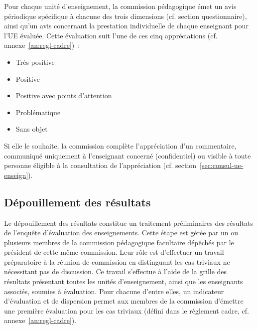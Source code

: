 \documentclass[a4paper,11pt]{report}
\begin{document}
Pour chaque unité d'enseignement, la commission pédagogique émet un avis périodique spécifique à chacune des trois dimensions (cf. section questionnaire), ainsi qu'un avis concernant la prestation individuelle de chaque enseignant pour l'UE évaluée.
Cette évaluation suit l'une de ces cinq appréciations (cf. annexe~\ref{an:regl-cadre})~:
\begin{itemize}
	\item Très positive
	\item Positive
	\item Positive avec points d'attention
	\item Problématique
	\item Sans objet
\end{itemize}
Si elle le souhaite, la commission complète l'appréciation d'un commentaire, communiqué uniquement à l'enseignant concerné (confidentiel) ou visible à toute personne éligible à la consultation de l'appréciation (cf. section~\ref{sec:consul-ue-enseign}).








\subsection{Dépouillement des résultats}
Le dépouillement des résultats constitue un traitement préliminaires des résultats de l'enquête d'évaluation des enseignements.
Cette étape est gérée par un ou plusieurs membres de la commission pédagogique facultaire dépêchés par le président de cette même commission.
Leur rôle est d'effectuer un travail préparatoire à la réunion de commission en distinguant les cas triviaux ne nécessitant pas de discussion.
Ce travail s'effectue à l'aide de la grille des résultats présentant toutes les unités d'enseignement, ainsi que les enseignants associés, soumies à évaluation.
Pour chacune d'entre elles, un indicateur d'évaluation et de dispersion permet aux membres de la commission d'émettre une première évaluation pour les cas triviaux (défini dans le règlement cadre, cf. annexe~\ref{an:regl-cadre}).





\end{document}
